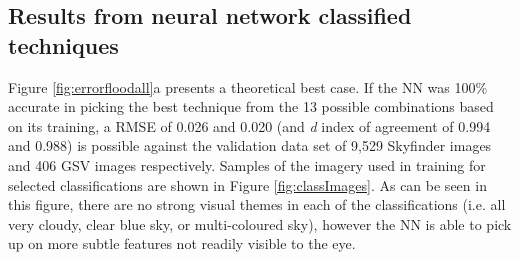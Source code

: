 \documentclass[final,3p,times,authoryear]{elsarticle}
\begin{document}
\subsection{Results from neural network classified techniques}\label{sec:resultsnn}
Figure \ref{fig:errorfloodall}a presents a theoretical best case. If the NN was 100\% accurate in picking the best technique from the 13 possible combinations based on its training, a RMSE of 0.026 and 0.020 (and \textit{d} index of agreement of 0.994 and 0.988) is possible against the validation data set of 9,529 Skyfinder images and 406 GSV images respectively. Samples of the imagery used in training for selected classifications are shown in Figure \ref{fig:classImages}. As can be seen in this figure, there are no strong visual themes in each of the classifications (i.e. all very cloudy, clear blue sky, or multi-coloured sky), however the NN is able to pick up on more subtle features not readily visible to the eye. 

\end{document}
